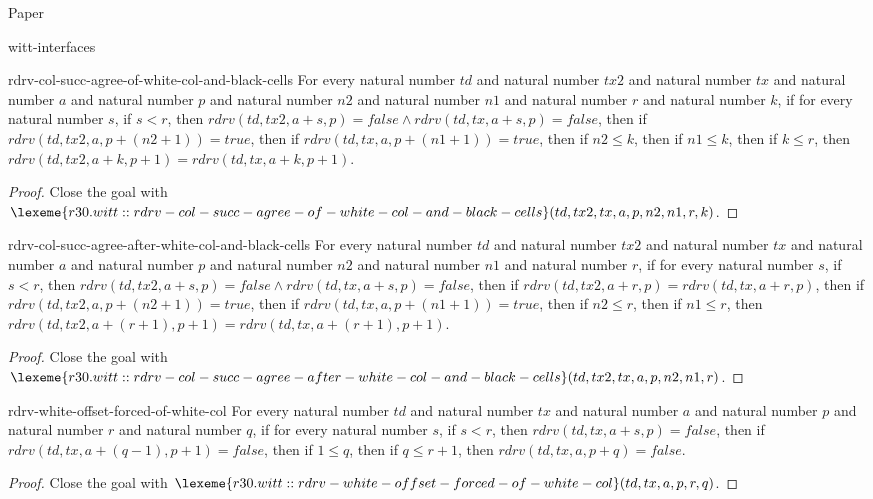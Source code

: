 \begin{lexlean}{Paper}
\begin{section}{witt-interfaces}
  \begin{theorem}{rdrv-col-succ-agree-of-white-col-and-black-cells}
  For every natural number \(td\) and natural number \(tx2\) and natural number \(tx\) and natural number \(a\) and natural number \(p\) and natural number \(n2\) and natural number \(n1\) and natural number \(r\) and natural number \(k\), if for every natural number \(s\), if \(s < r\), then \(rdrv(td, tx2, a + s, p) = false ∧ rdrv(td, tx, a + s, p) = false\), then if \(rdrv(td, tx2, a, p + (n2 + 1)) = true\), then if \(rdrv(td, tx, a, p + (n1 + 1)) = true\), then if \(n2 ≤ k\), then if \(n1 ≤ k\), then if \(k ≤ r\), then \(rdrv(td, tx2, a + k, p + 1) = rdrv(td, tx, a + k, p + 1)\).
  \begin{proof}
  Close the goal with \(\lexeme{r30.witt::rdrv-col-succ-agree-of-white-col-and-black-cells}(td, tx2, tx, a, p, n2, n1, r, k)\).
  \end{proof}
  \end{theorem}

  \begin{theorem}{rdrv-col-succ-agree-after-white-col-and-black-cells}
  For every natural number \(td\) and natural number \(tx2\) and natural number \(tx\) and natural number \(a\) and natural number \(p\) and natural number \(n2\) and natural number \(n1\) and natural number \(r\), if for every natural number \(s\), if \(s < r\), then \(rdrv(td, tx2, a + s, p) = false ∧ rdrv(td, tx, a + s, p) = false\), then if \(rdrv(td, tx2, a + r, p) = rdrv(td, tx, a + r, p)\), then if \(rdrv(td, tx2, a, p + (n2 + 1)) = true\), then if \(rdrv(td, tx, a, p + (n1 + 1)) = true\), then if \(n2 ≤ r\), then if \(n1 ≤ r\), then \(rdrv(td, tx2, a + (r + 1), p + 1) = rdrv(td, tx, a + (r + 1), p + 1)\).
  \begin{proof}
  Close the goal with \(\lexeme{r30.witt::rdrv-col-succ-agree-after-white-col-and-black-cells}(td, tx2, tx, a, p, n2, n1, r)\).
  \end{proof}
  \end{theorem}

  \begin{theorem}{rdrv-white-offset-forced-of-white-col}
  For every natural number \(td\) and natural number \(tx\) and natural number \(a\) and natural number \(p\) and natural number \(r\) and natural number \(q\), if for every natural number \(s\), if \(s < r\), then \(rdrv(td, tx, a + s, p) = false\), then if \(rdrv(td, tx, a + (q - 1), p + 1) = false\), then if \(1 ≤ q\), then if \(q ≤ r + 1\), then \(rdrv(td, tx, a, p + q) = false\).
  \begin{proof}
  Close the goal with \(\lexeme{r30.witt::rdrv-white-offset-forced-of-white-col}(td, tx, a, p, r, q)\).
  \end{proof}
  \end{theorem}


\end{section}
\end{lexlean}
